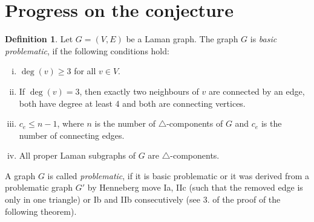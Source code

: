 \documentclass[a4paper, 11pt]{article}
\newcommand{\trcomps}{$\triangle$-components}
\theoremstyle{definition}
\newtheorem{defn}{Definition}[section]
\begin{document}
\section{Progress on the conjecture}
\begin{defn}
Let $G=(V,E)$ be a Laman graph. The graph $G$ is \textit{basic problematic}, if the following conditions hold:
\begin{enumerate}[i)]
	\item $\deg(v)\geq 3$ for all $v\in V$.
	\item If $\deg(v) =3$, then exactly two neighbours of $v$ are connected by an edge, both have degree at least 4 and both are connecting vertices.
	\item $c_e\leq n-1$, where $n$ is the number of \trcomps{} of $G$ and $c_e$ is the number of connecting edges.
	\item All proper Laman subgraphs of $G$ are \trcomps{}.
\end{enumerate}
A graph $G$ is called \emph{problematic}, if it is basic problematic or it was derived from a problematic graph $G'$ by Henneberg move Ia, IIc (such that the removed edge is only in one triangle) or Ib and IIb consecutively (see 3. of the proof of the following theorem).
\end{defn}
\end{document}
